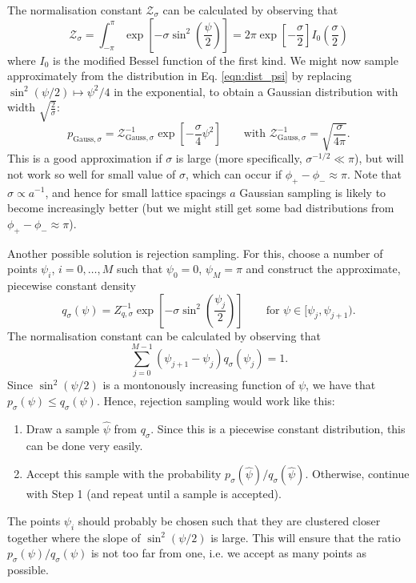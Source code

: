 \documentclass[11pt]{article}
\begin{document}
The normalisation constant $\mathcal{Z}_\sigma$ can be calculated by observing that
\begin{equation*}
  \mathcal{Z}_\sigma = \int_{-\pi}^{\pi} \exp\left[-\sigma\sin^2\left(\frac{\psi}{2}\right)\right] = 2\pi \exp\left[-\frac{\sigma}{2}\right]I_0\left(\frac{\sigma}{2}\right)
\end{equation*}
where $I_0$ is the modified Bessel function of the first kind. We might now sample approximately from the distribution in Eq. \eqref{eqn:dist_psi} by replacing $\sin^2(\psi/2)\mapsto \psi^2/4$ in the exponential, to obtain a Gaussian distribution with width $\sqrt{\frac{2}{\sigma}}$:
\begin{equation*}
  p_{\text{Gauss},\sigma} = \mathcal{Z}_{\text{Gauss},\sigma}^{-1} \exp\left[-\frac{\sigma}{4}\psi^2\right]\qquad\text{with $\mathcal{Z}_{\text{Gauss},\sigma}^{-1}=\sqrt{\frac{\sigma}{4\pi}}$}.
\end{equation*}
This is a good approximation if $\sigma$ is large (more specifically, $\sigma^{-1/2}\ll\pi$), but will not work so well for small value of $\sigma$, which can occur if $\phi_+-\phi_-\approx \pi$. Note that $\sigma\propto a^{-1}$, and hence for small lattice spacings $a$ Gaussian sampling is likely to become increasingly better (but we might still get some bad distributions from $\phi_+-\phi_-\approx\pi$).

Another possible solution is rejection sampling. For this, choose a number of points $\psi_i$, $i=0,\dots,M$ such that $\psi_0=0$, $\psi_M=\pi$ and construct the approximate, piecewise constant density
\begin{equation}
q_\sigma(\psi) = Z_{q,\sigma}^{-1} \exp\left[
-\sigma \sin^2\left(\frac{\psi_j}{2}\right)
\right]\qquad\text{for $\psi\in[\psi_{j},\psi_{j+1})$.}
\end{equation}
The normalisation constant can be calculated by observing that
\begin{equation*}
\sum_{j=0}^{M-1} (\psi_{j+1}-\psi_j) q_\sigma(\psi_j) = 1.
\end{equation*}
Since $\sin^2(\psi/2)$ is a montonously increasing function of $\psi$, we have that $p_\sigma(\psi)\le q_\sigma(\psi)$. Hence, rejection sampling would work like this:
\begin{enumerate}
\item Draw a sample $\hat{\psi}$ from $q_\sigma$. Since this is a piecewise constant distribution, this can be done very easily.
  \item Accept this sample with the probability $p_\sigma(\hat{\psi})/q_\sigma(\hat{\psi})$. Otherwise, continue with Step 1 (and repeat until a sample is accepted).
\end{enumerate}
The points $\psi_i$ should probably be chosen such that they are clustered closer together where the slope of $\sin^2(\psi/2)$ is large. This will ensure that the ratio $p_\sigma(\psi)/q_\sigma(\psi)$ is not too far from one, i.e. we accept as many points as possible.


\end{document}
